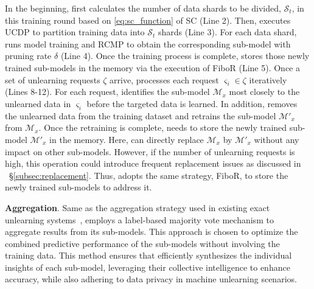 \documentclass[conference,compsoc]{IEEEtran}
\begin{document}
In the beginning, \tool first calculates the number of data shards to be divided, \ie $\mathcal{S}_t$, in this training round based on \eqref{eq:sc_function} of SC (Line 2). Then, \tool executes UCDP to partition training data into $\mathcal{S}_t$ shards (Line 3). For each data shard, \tool runs model training and RCMP to obtain the corresponding sub-model with pruning rate $\delta$ (Line 4). Once the training process is complete, \tool stores those newly trained sub-models in the memory via the execution of FiboR (Line 5).
Once a set of unlearning requests $\zeta$ arrive, \tool processes each request $\varsigma_i \in \zeta$ iteratively (Lines 8-12). For each request, \tool identifies the sub-model $\mathcal{M}_x$ most closely to the unlearned data in $\varsigma_i$ before the targeted data is learned. In addition, \tool removes the unlearned data from the training dataset and retrains the sub-model $\mathcal{M}'_x$ from $\mathcal{M}_x$. Once the retraining is complete, \tool needs to store the newly trained sub-model $\mathcal{M}'_x$ in the memory. Here, \tool can directly replace $\mathcal{M}_x$ by $\mathcal{M}'_x$ without any impact on other sub-models. However, if the number of unlearning requests is high, this operation could introduce frequent replacement issues as discussed in ~\S\ref{subsec:replacement}. Thus, \tool adopts the same strategy, \ie FiboR, to store the newly trained sub-models to address it.

\noindent\textbf{Aggregation}. Same as the aggregation strategy used in existing exact unlearning systems~\cite{bourtoule2021machine, yan2022arcane}, \tool employs a label-based majority vote mechanism to aggregate results from its sub-models. This approach is chosen to optimize the combined predictive performance of the sub-models without involving the training data. This method ensures that \tool efficiently synthesizes the individual insights of each sub-model, leveraging their collective intelligence to enhance accuracy, while also adhering to data privacy in machine unlearning scenarios. 
\end{document}
